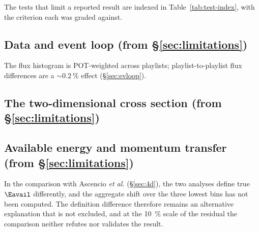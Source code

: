The tests that limit a reported result are indexed in Table~\ref{tab:test-index}, with the criterion each was graded against.




\subsection{Data and event loop (from \S\ref{sec:limitations})}\label{rlim:experiment}
The flux histogram is POT-weighted across playlists; playlist-to-playlist flux differences are a $\sim\SI{0.2}{\percent}$ effect (\S\ref{sec:evloop}).


\subsection{The two-dimensional cross section (from \S\ref{sec:limitations})}\label{rlim:2d}


\subsection{Available energy and momentum transfer (from \S\ref{sec:limitations})}\label{rlim:3d}
In the comparison with Ascencio \emph{et al.} (\S\ref{sec:4d}), the two analyses define true $\Eavail$ differently, and the aggregate shift over the three lowest bins has not been computed. The definition difference therefore remains an alternative explanation that is not excluded, and at the \SI{10}{\percent} scale of the residual the comparison neither refutes nor validates the result.

